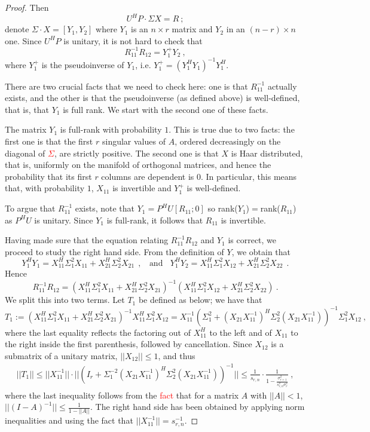 \documentclass{article}
\newcommand{\red}[1]{\textcolor{red}{#1}}
\theoremstyle{definition}
\newcommand{\smin}{s_{r,n}}
\begin{document}
\begin{proof}
Then 
\[
U^H P \cdot \Sigma X = R~;
\]
denote $\Sigma \cdot X = [Y_1, Y_2]$ where $Y_1$ is an $n \times r$ matrix and $Y_2$ in an $(n-r) \times n$ one. Since $U^{H}P$ is unitary, it is not hard to check that 
\[
R_{11}^{-1} R_{12} = Y_1^{+} Y_2~,
\]
where $Y_1^{+}$ is the pseudoinverse of $Y_1$, i.e. $Y_1^{+} = (Y_1^H
Y_1)^{-1} Y_1^H$. 

There are two crucial facts that we need  to check here: one is that $R_{11}^{-1}$ actually exists, and the other is that the pseudoinverse (as defined above) is well-defined, that is, that $Y_1$ is full rank. We start with the second one of these facts.

The matrix $Y_1$ is full-rank with probability $1$. This is true due to two facts: the first one is that the first $r$ singular values of $A$, ordered decreasingly on the diagonal of \red{$\Sigma$}, are strictly positive. The second one is that $X$ is Haar distributed, that is, uniformly on the manifold of orthogonal matrices, and hence the probability that its first $r$ columns are dependent is $0$. In particular, this means that, with probability $1$, $X_{11}$ is invertible and $Y_1^{+}$ is well-defined. 

To argue that $R_{11}^{-1}$ exists, note that $Y_1 = P^HU[R_{11};0]$ so rank($Y_1$)$=$rank($R_{11}$) as $P^HU$ is unitary.  Since $Y_1$ is full-rank, it follows that $R_{11}$ is invertible.

Having made sure that the equation relating $R_{11}^{-1} R_{12}$ and $Y_1$ is correct, we proceed to study the right hand side. From the definition of $Y$, we obtain that
\[
Y_1^H Y_1 = X_{11}^H \Sigma_{1}^2 X_{11} + X_{21}^H\Sigma_2^2 X_{21}~~, ~~~~\mbox{and}~~~~ Y_1^H Y_2 = X_{11}^H \Sigma_{1}^2 X_{12} + X_{21}^H\Sigma_2^2 X_{22}~~.
\]
Hence
\[
R_{11}^{-1} R_{12} = \left (X_{11}^{H} \Sigma_1^2 X_{11} + X_{21}^{H} \Sigma_2^2 X_{21} \right)^{-1} \left ( X_{11}^{H} \Sigma_1^2 X_{12} + X_{21}^{H} \Sigma_2^2 X_{22} \right)~.
\]
We split this into two terms. Let $T_1$ be defined as below; we have that
\[
T_1 := \left (X_{11}^{H} \Sigma_1^2 X_{11} + X_{21}^H \Sigma^2_2 X_{21} \right )^{-1} X_{11}^{H} \Sigma_1^2 X_{12} = X_{11}^{-1} \left ( \Sigma_1^2 + (X_{21} X_{11}^{-1})^{H} \Sigma_2^2 (X_{21} X_{11}^{-1}) \right )^{-1} \Sigma_1^2 X_{12}~,
\]
where the last equality reflects the factoring out of $X_{11}^H$ to the left and of $X_{11}$ to the right inside the first parenthesis, followed by cancellation. 
Since $X_{12}$ is a submatrix of a unitary matrix, $||X_{12}|| \leq 1$, and thus
\begin{eqnarray} \label{r-bound}
||T_1|| \leq ||X_{11}^{-1}|| \cdot  || \left (I_r + \Sigma_1^{-2} (X_{21} X_{11}^{-1})^{H} \Sigma_2^2 (X_{21} X_{11}^{-1}) \right )^{-1}|| \leq \frac{1}{\smin} \cdot \frac{1}{1 - \frac{\sigma_{r+1}^2}{ \smin^2 \sigma_r^2}}~,
\end{eqnarray}
where the last inequality follows from the \red{fact} that for a matrix $A$ with $||A||<1$, $||(I-A)^{-1}|| \leq \frac{1}{1 - ||A||}$. The right hand side has been obtained by applying norm inequalities and using the fact that $||X_{11}^{-1}|| = \smin^{-1}$. 


\end{proof}
\end{document}
